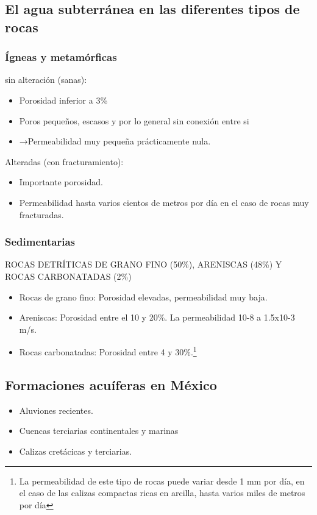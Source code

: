 \subsection{El agua subterránea en las diferentes tipos de rocas}
\subsubsection{Ígneas y metamórficas}

sin alteración (sanas):
\begin{itemize}
\item Porosidad inferior a 3\%
\item Poros pequeños, escasos y por lo general sin conexión entre si
\item →Permeabilidad muy pequeña prácticamente nula.
\end{itemize}
Alteradas (con fracturamiento):
\begin{itemize}
    \item Importante porosidad.
    \item Permeabilidad hasta varios cientos de metros por día en el caso de rocas muy fracturadas.    
\end{itemize}
\subsubsection{Sedimentarias}
ROCAS DETRÍTICAS DE GRANO FINO (50\%), ARENISCAS (48\%) Y ROCAS CARBONATADAS (2\%)
\begin{itemize}
    \item Rocas de grano fino: Porosidad elevadas, permeabilidad muy baja.
    \item Areniscas: Porosidad entre el 10 y 20\%. La
    permeabilidad 10-8 a 1.5x10-3 m/s.
    \item Rocas carbonatadas: Porosidad entre 4 y 30\%.\footnote{La permeabilidad de este tipo de rocas puede variar desde 1 mm por día, en el caso de las calizas compactas ricas en arcilla, hasta varios miles de metros por día}
\end{itemize}
\subsection{Formaciones acuíferas en México}
\begin{itemize}
    \item Aluviones recientes.
    \item Cuencas terciarias continentales y marinas
    \item Calizas cretácicas y terciarias.
\end{itemize}
